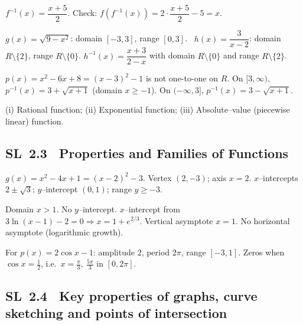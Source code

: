 \documentclass[11pt]{article}
\def\mathbb#1{#1}%
\newcommand{\tocsubsection}[1]{\subsection{#1}}
\begin{document}
\begin{solution}
$f^{-1}(x)=\dfrac{x+5}{2}$.  Check: $f(f^{-1}(x))=2\cdot\dfrac{x+5}{2}-5=x$.
\end{solution}

\begin{solution}
$g(x)=\sqrt{9-x^2}$: domain $[-3,3]$, range $[0,3]$. \
$h(x)=\dfrac{3}{x-2}$: domain $\mathbb{R}\setminus\{2\}$, range $\mathbb{R}\setminus\{0\}$.
$h^{-1}(x)=\dfrac{x+3}{2-x}$ with domain $\mathbb{R}\setminus\{0\}$ and range $\mathbb{R}\setminus\{2\}$.
\end{solution}

\begin{solution}
$p(x)=x^2-6x+8=(x-3)^2-1$ is not one-to-one on $\mathbb{R}$.
On $[3,\infty)$, $p^{-1}(x)=3+\sqrt{x+1}$ (domain $x\ge-1$). On $(-\infty,3]$, $p^{-1}(x)=3-\sqrt{x+1}$.
\end{solution}

\begin{solution}
(i) Rational function; (ii) Exponential function; (iii) Absolute–value (piecewise linear) function.
\end{solution}


\tocsubsection{SL 2.3 \; Properties and Families of Functions}

\begin{solution}
$g(x)=x^2-4x+1=(x-2)^2-3$. Vertex $(2,-3)$; axis $x=2$.
$x$–intercepts $2\pm\sqrt{3}$; $y$–intercept $(0,1)$; range $y\ge -3$.
\end{solution}

\begin{solution}
Domain $x>1$.  No $y$–intercept.  $x$–intercept from $3\ln(x-1)-2=0\Rightarrow x=1+e^{2/3}$.
Vertical asymptote $x=1$. No horizontal asymptote (logarithmic growth).
\end{solution}

\begin{solution}
For $p(x)=2\cos x-1$: amplitude $2$, period $2\pi$, range $[-3,1]$.
Zeros when $\cos x=\tfrac12$, i.e.\ $x=\tfrac{\pi}{3},\ \tfrac{5\pi}{3}$ in $[0,2\pi]$.
\end{solution}



\tocsubsection{SL 2.4 \; Key properties of graphs, curve sketching and points of intersection}
\end{document}
